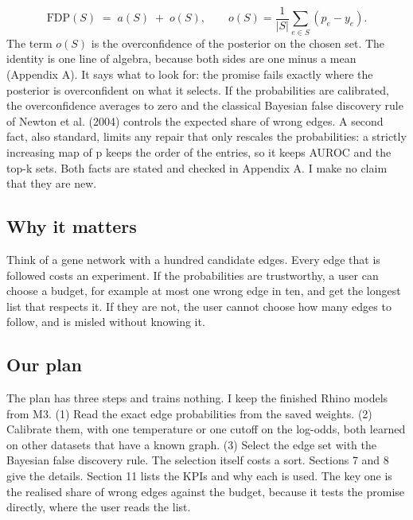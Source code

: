 \documentclass[10pt]{article}
\begin{document}
\begin{equation}\mathrm{FDP}(S)\;=\;a(S)\;+\;o(S),\qquad o(S)=\frac{1}{|S|}\sum_{e\in S}(p_e-y_e).\end{equation}
The term $o(S)$ is the overconfidence of the posterior on the chosen set. The identity is one line of algebra, because both sides are one minus a mean (Appendix A). It says what to look for: the promise fails exactly where the posterior is overconfident on what it selects. If the probabilities are calibrated, the overconfidence averages to zero and the classical Bayesian false discovery rule of Newton et al. (2004) controls the expected share of wrong edges. A second fact, also standard, limits any repair that only rescales the probabilities: a strictly increasing map of p keeps the order of the entries, so it keeps AUROC and the top-k sets. Both facts are stated and checked in Appendix A. I make no claim that they are new.

\subsection{Why it matters}
Think of a gene network with a hundred candidate edges. Every edge that is followed costs an experiment. If the probabilities are trustworthy, a user can choose a budget, for example at most one wrong edge in ten, and get the longest list that respects it. If they are not, the user cannot choose how many edges to follow, and is misled without knowing it.

\subsection{Our plan}
The plan has three steps and trains nothing. I keep the finished Rhino models from M3. (1) Read the exact edge probabilities from the saved weights. (2) Calibrate them, with one temperature or one cutoff on the log-odds, both learned on other datasets that have a known graph. (3) Select the edge set with the Bayesian false discovery rule. The selection itself costs a sort. Sections 7 and 8 give the details. Section 11 lists the KPIs and why each is used. The key one is the realised share of wrong edges against the budget, because it tests the promise directly, where the user reads the list.
\end{document}
